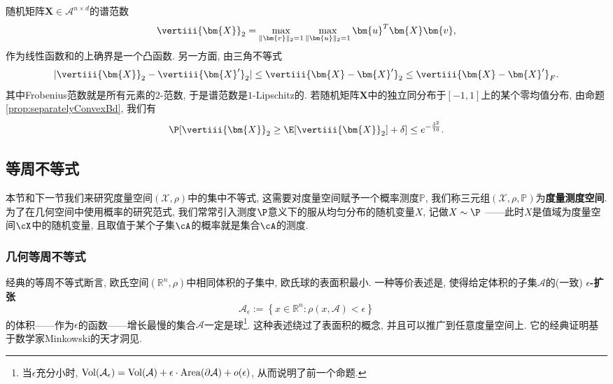 \begin{example}[随机矩阵的谱范数]
	随机矩阵$\bm{X} \in \mathcal{A}^{n \times d}$的谱范数
	\begin{equation*}
		\vertiii{\bm{X}}_2 = \max_{\|\bm{v}\|_2 = 1} \max_{\|\bm{u}\|_2 = 1} \bm{u}^T \bm{X} \bm{v}, 
	\end{equation*}
	作为线性函数和的上确界是一个凸函数. 
	另一方面, 由三角不等式
	\begin{equation*}
		|\vertiii{\bm{X}}_2 - \vertiii{\bm{X}'}_2|
		\leq \vertiii{\bm{X} - \bm{X}'}_2
		\leq \vertiii{\bm{X} - \bm{X}'}_F. 
	\end{equation*}
	其中Frobenius范数就是所有元素的$2$-范数, 于是谱范数是$1$-Lipschitz的. 
	若随机矩阵$\bm{X}$中的独立同分布于$[-1,1]$上的某个零均值分布, 由命题\ref{prop:separatelyConvexBd}, 我们有
	\begin{equation*}
		\P[ \vertiii{\bm{X}}_2 \geq \E[\vertiii{\bm{X}}_2] + \delta]
		\leq e^{-\frac{\delta^2}{16}}. 
	\end{equation*}
\end{example}


\subsection{等周不等式}

本节和下一节我们来研究度量空间$(\mathcal{X}, \rho)$中的集中不等式, 这需要对度量空间赋予一个概率测度$\mathbb{P}$, 我们称三元组$(\mathcal{X}, \rho, \mathbb{P})$为\textbf{度量测度空间}. 
为了在几何空间中使用概率的研究范式, 我们常常引入测度$\P$意义下的服从均匀分布的随机变量$X$, 记做$X \sim \P$ ——此时$X$是值域为度量空间$\cX$中的随机变量, 且取值于某个子集$\cA$的概率就是集合$\cA$的测度. 


\subsubsection{几何等周不等式}
经典的等周不等式断言, 欧氏空间$(\mathbb{R}^n, \rho)$中相同体积的子集中, 欧氏球的表面积最小. 
一种等价表述是, 使得给定体积的子集$\mathcal{A}$的(一致) \textbf{$\epsilon$-扩张}
\begin{equation*}
	\mathcal{A}_{\epsilon} := \left\{ x \in \mathbb{R}^n \colon \rho(x, \mathcal{A}) < \epsilon \right\}
\end{equation*}
的体积——作为$\epsilon$的函数——增长最慢的集合$\mathcal{A}$一定是球\footnote{当$\epsilon$充分小时, $\operatorname{Vol}(\mathcal{A}_{\epsilon}) = \operatorname{Vol}(\mathcal{A}) + \epsilon \cdot \operatorname{Area}(\partial \mathcal{A}) + o(\epsilon)$, 从而说明了前一个命题.}. 
这种表述绕过了表面积的概念, 并且可以推广到任意度量空间上. 
它的经典证明基于数学家Minkowski的天才洞见. 


